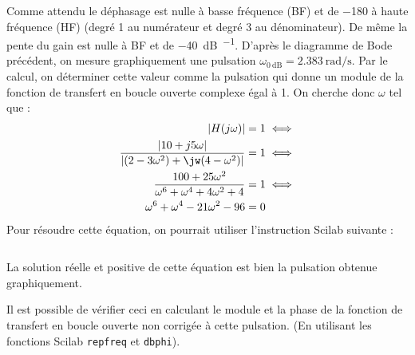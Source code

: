 Comme attendu le déphasage est nulle à basse fréquence (BF) et de 
\SI{-180}{\degreeSI} à haute fréquence (HF) (degré 1 au numérateur et 
degré 3 au dénominateur). De même la pente du gain est nulle à BF et 
de \SI{-40}{\dB\per\dec}.
D'après le diagramme de Bode précédent, on mesure graphiquement une pulsation
$\omega_{\SI{0}{\dB}}=\SI{2.383}{\radian\per\second}$.
Par le calcul, on déterminer cette valeur comme la pulsation qui donne un 
module de la fonction de transfert en boucle ouverte complexe égal à 1.
On cherche donc $\omega$ tel que :
\begin{align*}
    |H(j\omega)|=1 &\iff \\
    \dfrac{|10+j5\omega|}{|(2-3\omega^2)+\jw(4-\omega^2)|}=1 &\iff \\
    \dfrac{100+25\omega^2}{\omega^6+\omega^4+4\omega^2+4}=1 &\iff \\
    \omega^6+\omega^4-21\omega^2-96=0
\end{align*}
Pour résoudre cette équation, on pourrait utiliser l'instruction Scilab 
suivante :
\inputminted{scilab}{codes/scilab/code_q2_1_chap_correction.sce}
La solution réelle et positive de cette équation est bien la pulsation obtenue
graphiquement.

Il est possible de vérifier ceci en calculant le module et la phase de la 
fonction de transfert en boucle ouverte non corrigée à cette pulsation. 
(En utilisant les fonctions Scilab \texttt{repfreq} et \texttt{dbphi}). 
\inputminted{scilab}{codes/scilab/code_q2_2_chap_correction.sce}

